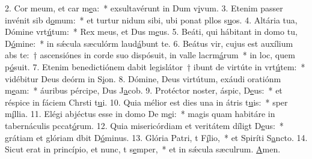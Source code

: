 2. Cor meum, et car m\uline{e}a:~* exsultavérunt in Dum v\uline{i}vum.
3. Etenim passer invénit sib d\uline{o}mum:~* et turtur nidum sibi, ubi ponat pllos s\uline{u}os.
4. Altária tua, Dómine vrt\uline{ú}tum:~* Rex meus, et Dus m\uline{e}us.
5. Beáti, qui hábitant in domo tu, D\uline{ó}mine:~* in sǽcula sæculórm laud\uline{á}bunt te.
6. Beátus vir, cujus est auxílium abs te:~† ascensiónes in corde suo dispósuit, in valle lacrm\uline{á}rum~* in loc, quem p\uline{ó}suit.
7. Etenim benedictiónem dabit legislátor~† ibunt de virtúte in vrt\uline{ú}tem:~* vidébitur Deus deórm in S\uline{i}on.
8. Dómine, Deus virtútum, exáudi oratiónm m\uline{e}am:~* áuribus pércipe, Dus J\uline{a}cob.
9. Protéctor noster, áspic, D\uline{e}us:~* et réspice in fáciem Chrsti t\uline{u}i.
10. Quia mélior est dies una in átris t\uline{u}is:~* sper m\uline{í}llia.
11. Elégi abjéctus esse in domo De m\uline{e}i:~* magis quam habitáre in tabernáculis pccat\uline{ó}rum.
12. Quia misericórdiam et veritátem díligt D\uline{e}us:~* grátiam et glóriam dbit D\uline{ó}minus.
13. Glória Patri, t F\uline{í}lio,~* et Spiríti S\uline{a}ncto.
14. Sicut erat in princípio, et nunc, t s\uline{e}mper,~* et in sǽcula sæculrum. \uline{A}men.

